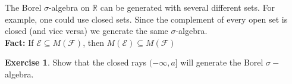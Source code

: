 \documentclass[12pt]{book}
\newcommand{\rr}{\mathbb{R}}
\theoremstyle{definition}
\newtheorem{ex}{Exercise}
\begin{document}
	The Borel $\sigma$-algebra on $\rr$ can be generated with several different sets.  For example, one could use closed sets.
	Since the complement of every open set is closed (and vice versa) we generate the same $\sigma$-algebra.\\
	
	\noindent\textbf{Fact: } If $\mathcal{E} \subseteq M(\mathcal{F})$, then $M(\mathcal{E}) \subseteq M(\mathcal{F})$
	
	\begin{ex}
		Show that the closed rays $(-\infty,a]$ will generate the Borel $\sigma-$algebra. 
	\end{ex}
\end{document}
